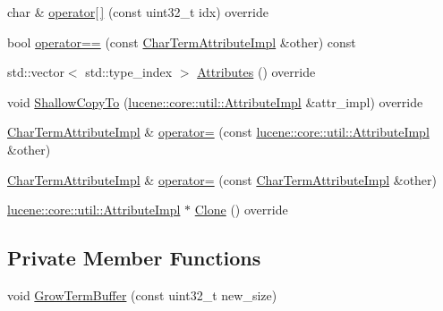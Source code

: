 \begin{DoxyCompactItemize}
char \& \mbox{\hyperlink{classlucene_1_1core_1_1analysis_1_1tokenattributes_1_1CharTermAttributeImpl_a65259a0e94791f009d7109f7bbd7d74e}{operator\mbox{[}$\,$\mbox{]}}} (const uint32\+\_\+t idx) override
\item 
bool \mbox{\hyperlink{classlucene_1_1core_1_1analysis_1_1tokenattributes_1_1CharTermAttributeImpl_a2d741886d3be18e04bcbc1fbccad62a1}{operator==}} (const \mbox{\hyperlink{classlucene_1_1core_1_1analysis_1_1tokenattributes_1_1CharTermAttributeImpl}{Char\+Term\+Attribute\+Impl}} \&other) const
\item 
std\+::vector$<$ std\+::type\+\_\+index $>$ \mbox{\hyperlink{classlucene_1_1core_1_1analysis_1_1tokenattributes_1_1CharTermAttributeImpl_a7d8986b373cd9c2dfb2de25dd12000fd}{Attributes}} () override
\item 
void \mbox{\hyperlink{classlucene_1_1core_1_1analysis_1_1tokenattributes_1_1CharTermAttributeImpl_ae37cc1fbce5614f5e60800d3f9f96d33}{Shallow\+Copy\+To}} (\mbox{\hyperlink{classlucene_1_1core_1_1util_1_1AttributeImpl}{lucene\+::core\+::util\+::\+Attribute\+Impl}} \&attr\+\_\+impl) override
\item 
\mbox{\hyperlink{classlucene_1_1core_1_1analysis_1_1tokenattributes_1_1CharTermAttributeImpl}{Char\+Term\+Attribute\+Impl}} \& \mbox{\hyperlink{classlucene_1_1core_1_1analysis_1_1tokenattributes_1_1CharTermAttributeImpl_ac49b714c3f8e438ddaa27dc1a2421144}{operator=}} (const \mbox{\hyperlink{classlucene_1_1core_1_1util_1_1AttributeImpl}{lucene\+::core\+::util\+::\+Attribute\+Impl}} \&other)
\item 
\mbox{\hyperlink{classlucene_1_1core_1_1analysis_1_1tokenattributes_1_1CharTermAttributeImpl}{Char\+Term\+Attribute\+Impl}} \& \mbox{\hyperlink{classlucene_1_1core_1_1analysis_1_1tokenattributes_1_1CharTermAttributeImpl_a4a53d4368af86441243246af1722390f}{operator=}} (const \mbox{\hyperlink{classlucene_1_1core_1_1analysis_1_1tokenattributes_1_1CharTermAttributeImpl}{Char\+Term\+Attribute\+Impl}} \&other)
\item 
\mbox{\hyperlink{classlucene_1_1core_1_1util_1_1AttributeImpl}{lucene\+::core\+::util\+::\+Attribute\+Impl}} $\ast$ \mbox{\hyperlink{classlucene_1_1core_1_1analysis_1_1tokenattributes_1_1CharTermAttributeImpl_a518bf3f405ddf676ee58fccb02ae3c23}{Clone}} () override
\end{DoxyCompactItemize}
\subsection*{Private Member Functions}
\begin{DoxyCompactItemize}
\item 
void \mbox{\hyperlink{classlucene_1_1core_1_1analysis_1_1tokenattributes_1_1CharTermAttributeImpl_a4e54d600b1368df46af61c9bdae71cc0}{Grow\+Term\+Buffer}} (const uint32\+\_\+t new\+\_\+size)
\end{DoxyCompactItemize}
